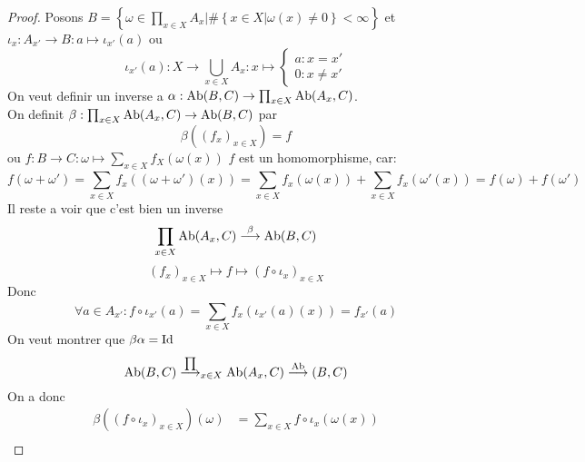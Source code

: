 \documentclass[../main.tex]{subfiles}
\begin{document}
\begin{proof}
Posons $B = \left\{ \omega\in \prod_{x\in X} A_x | \# \left\{ x\in X| \omega( x) \neq 0 \right\} < \infty  \right\} $ et $\iota_x: A_{x'} \to B: a \mapsto \iota_{x'} (a ) $ ou 
\[ 
\iota_{x'} ( a) : X \to \bigcup_{x\in X} A_x: x \mapsto 
\begin{cases}
a: x= x'\\
0: x\neq x'
\end{cases}
\]
On veut definir un inverse a $\alpha: \operatorname{Ab}( B,C) \to \prod_{x\in X} \operatorname{Ab}( A_x,C) $.\\
On definit $\beta: \prod_{x\in X} \operatorname{Ab}( A_x,C) \to \operatorname{Ab}( B,C) $ par
\[ 
\beta( ( f_x) _{x\in X} ) = f 
\]
ou $f: B\to C: \omega\mapsto \sum_{x\in X}^{ }f_X( \omega( x) ) $ 
$f$ est un homomorphisme, car:
\[ 
f( \omega+\omega') = \sum_{x\in X}^{ }f_x ( ( \omega+\omega') ( x) ) = \sum_{x\in X}^{ }f_x( \omega( x) ) + \sum_{x\in X}^{ }f_x( \omega'( x) ) = f( \omega) + f( \omega') 
\]
Il reste a voir que c'est bien un inverse
\[ 
\prod_{x\in X} \operatorname{Ab}( A_x,C) \overset{\beta}{\longrightarrow} \operatorname{Ab}( B,C) 
\]
\[ 
	( f_x)_{x\in X} \mapsto f \mapsto ( f\circ \iota_x)_{x\in X} 
\]
Donc 
\[ 
\forall a \in A_{x'} : f\circ \iota_{x'} ( a) = \sum_{x\in X}^{ }f_x( \iota_{x'} ( a) ( x) ) = f_{x' } ( a)  
\]
On veut montrer que $\beta\alpha= \operatorname{Id}$ 
\[ 
\operatorname{Ab}( B,C) \overset{\prod}{\longrightarrow}_{x\in X} \operatorname{Ab}( A_x,C) \overset{\operatorname{Ab}}{\longrightarrow}( B,C)
\]
On a donc
\begin{align*}
	\beta( ( f\circ\iota_x) _{x\in X} )( \omega) &= \sum_{x\in X}^{ }f\circ \iota_x( \omega( x) ) \\
\end{align*}


		
\end{proof}
							
\end{document}
